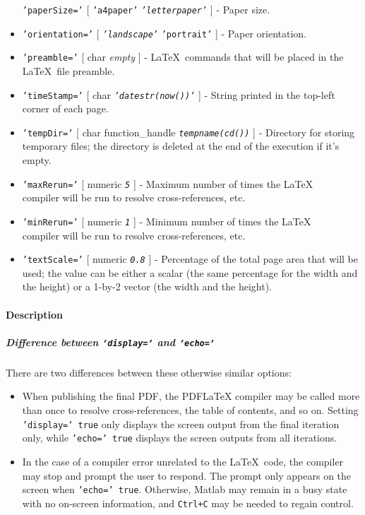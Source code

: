 \begin{itemize}
   \texttt{'paperSize='} {[} \texttt{'a4paper'} \textbar{}
   \emph{\texttt{'letterpaper'}} {]} - Paper size.
 \item
   \texttt{'orientation='} {[} \emph{\texttt{'landscape'}} \textbar{}
   \texttt{'portrait'} {]} - Paper orientation.
 \item
   \texttt{'preamble='} {[} char \textbar{} \emph{empty} {]} -
   \LaTeX~commands that will be placed in the \LaTeX~file preamble.
 \item
   \texttt{'timeStamp='} {[} char \textbar{}
   \emph{\texttt{'datestr(now())'}} {]} - String printed in the top-left
   corner of each page.
 \item
   \texttt{'tempDir='} {[} char \textbar{} function\_handle \textbar{}
   \emph{\texttt{tempname(cd())}} {]} - Directory for storing temporary
   files; the directory is deleted at the end of the execution if it's
   empty.
 \item
   \texttt{'maxRerun='} {[} numeric \textbar{} \emph{\texttt{5}} {]} -
   Maximum number of times the \LaTeX\\compiler will be run to resolve
   cross-references, etc.
 \item
   \texttt{'minRerun='} {[} numeric \textbar{} \emph{\texttt{1}} {]} -
   Minimum number of times the \LaTeX\\compiler will be run to resolve
   cross-references, etc.
 \item
   \texttt{'textScale='} {[} numeric \textbar{} \emph{\texttt{0.8}} {]} -
   Percentage of the total page area that will be used; the value can be
   either a scalar (the same percentage for the width and the height) or
   a 1-by-2 vector (the width and the height).
 \end{itemize}
 
 \paragraph{Description}
 
 \subparagraph{Difference between \texttt{'display='} and
 \texttt{'echo='}}
 
 There are two differences between these otherwise similar options:
 
 \begin{itemize}
 \item
   When publishing the final PDF, the PDFLaTeX compiler may be called
   more than once to resolve cross-references, the table of contents, and
   so on. Setting \texttt{'display=' true} only displays the screen
   output from the final iteration only, while \texttt{'echo=' true}
   displays the screen outputs from all iterations.
 \item
   In the case of a compiler error unrelated to the \LaTeX~code, the
   compiler may stop and prompt the user to respond. The prompt only
   appears on the screen when \texttt{'echo=' true}. Otherwise, Matlab
   may remain in a busy state with no on-screen information, and
   \texttt{Ctrl+C} may be needed to regain control.
 \end{itemize}
 
